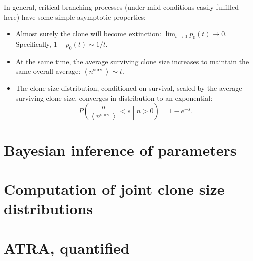 \documentclass[10pt,UKenglish]{article}
\begin{document}
In general, critical branching processes (under mild conditions easily fulfilled
here) have some simple asymptotic properties:
\begin{itemize}
	\item Almost surely the clone will become extinction: $\lim_{t
	\rightarrow 0} p_0(t) \rightarrow 0$. Specifically, $1 - p_0(t) \sim
	1/t$. 
	\item At the same time, the average surviving clone size increases to
	maintain the same overall average: $\left\langle n^\textrm{surv.}
	\right\rangle \sim t$.
	\item The clone size distribution, conditioned on survival, scaled by
	the average surviving clone size, converges in distribution to an
	exponential: $$P\left(\frac{n}{\left\langle n^\textrm{surv.}
	\right\rangle} < s \middle| n > 0 \right) = 1 - e^{-s}.$$
\end{itemize}

\section{Bayesian inference of parameters}

\section{Computation of joint clone size distributions}

\section{ATRA, quantified}
\end{document}
